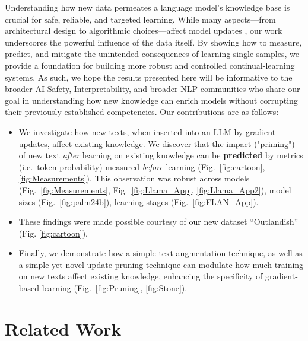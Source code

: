 \documentclass[11pt, a4paper, logo, copyright]{googledeepmind}
\theoremstyle{plain}
\theoremstyle{definition}
\theoremstyle{remark}
\begin{document}
Understanding how new data permeates a language model’s knowledge base is crucial for safe, reliable, and targeted learning. While many aspects—from architectural design to algorithmic choices—affect model updates \citep{bau1, locality, memory_neel, memory4}, our work underscores the powerful influence of the data itself. By showing how to measure, predict, and mitigate the unintended consequences of learning single samples, we provide a foundation for building more robust and controlled continual-learning systems. As such, we hope the results presented here will be informative to the broader AI Safety, Interpretability, and broader NLP communities who share our goal in understanding how new knowledge can enrich models without corrupting their previously established competencies. Our contributions are as follows: 
\begin{itemize} %
\item We investigate how new texts, when inserted into an LLM by gradient updates, affect existing knowledge. We discover that the impact ("priming") of new text \textit{after} learning on existing knowledge can be \textbf{predicted} by metrics (i.e.\ token probability) measured \textit{before} learning (Fig.~\ref{fig:cartoon}, \ref{fig:Measurements}). This observation was robust across models (Fig.~\ref{fig:Measurements}, Fig.~\ref{fig:Llama_App}, \ref{fig:Llama_App2}), model sizes (Fig.~\ref{fig:palm24b}), learning stages (Fig.~\ref{fig:FLAN_App}). 
\item These findings were made possible courtesy of our new dataset ``Outlandish'' (Fig. \ref{fig:cartoon}).

\item Finally, we demonstrate how a simple text augmentation technique, as well as a simple yet novel update pruning technique can modulate how much training on new texts affect existing knowledge, enhancing the specificity of gradient-based learning (Fig.~\ref{fig:Pruning}, \ref{fig:Stone}). 




\end{itemize}





\section{Related Work}
\label{sec:related}
\end{document}
